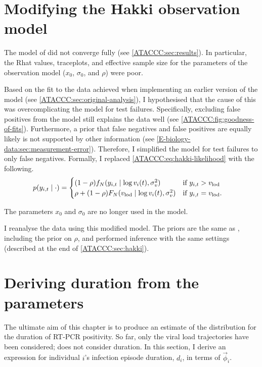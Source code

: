\documentclass[thesis.tex]{subfiles}
\begin{document}
\section{Modifying the Hakki observation model} \label{ATACCC:sec:observation-modification}

The model of \textcite{hakkiOnset} did not converge fully (see \cref{ATACCC:sec:results}).
In particular, the Rhat values, traceplots, and effective sample size for the parameters of the observation model ($x_0$, $\sigma_0$, and $\rho$) were poor.

Based on the fit to the data achieved when implementing an earlier version of the model (see \cref{ATACCC:sec:original-analysis}), I hypothesised that the cause of this was overcomplicating the model for test failures.
Specifically, excluding false positives from the model still explains the data well (see \cref{ATACCC:fig:goodness-of-fits}).
Furthermore, a prior that false negatives and false positives are equally likely is not supported by other information (see \cref{E-biology-data:sec:measurement-error}).
Therefore, I simplified the model for test failures to only false negatives.
Formally, I replaced \cref{ATACCC:eq:hakki-likelihood} with the following.
\begin{align}
p(y_{i,t} \mid \cdot) &= \begin{cases}
    (1 - \rho) f_N(y_{i,t} \mid \log v_i(t), \sigma_v^2) & \text{if $y_{i,t} > v_\text{lod}$}\\
    \rho + (1 - \rho) F_N(v_\text{lod} \mid \log v_i(t), \sigma_v^2) & \text{if $y_{i,t} = v_\text{lod}$.}
\end{cases}
\end{align}

The parameters $x_0$ and $\sigma_0$ are no longer used in the model.

I reanalyse the data using this modified model.
The priors are the same as \textcite{hakkiOnset}, including the prior on $\rho$, and performed inference with the same settings (described at the end of \cref{ATACCC:sec:hakki}).


\section{Deriving duration from the parameters} \label{ATACCC:sec:duration}

The ultimate aim of this chapter is to produce an estimate of the distribution for the duration of RT-PCR positivity.
So far, only the viral load trajectories have been considered; \textcite{hakkiOnset} does not consider duration.
In this section, I derive an expression for individual $i$'s infection episode duration, $d_i$, in terms of $\vec{\phi}_i$.
\end{document}
